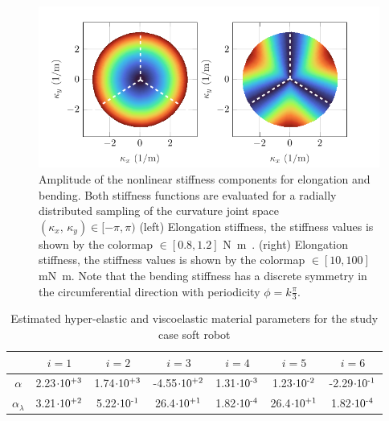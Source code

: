 \pgfplotsset{colormap name=turbo}
\begin{figure}[!t]
  \vspace{-5mm}
  \centering
  \includegraphics*{./pdf/thesis-figure-4-9.pdf}
  \vspace{-0.25cm}
  \caption{ Amplitude of the nonlinear stiffness components for elongation and bending. Both stiffness functions are evaluated for a radially distributed sampling of the curvature joint space $(\kappa_x,\,\kappa_y) \in [-\pi,\pi)$ (left) Elongation stiffness, the stiffness values is shown by the colormap \protect{}$\!\!\in [0.8,1.2]$ \si{\newton \meter \inv}. (right) Elongation stiffness, the stiffness values is shown by the colormap \protect{}$\!\!\in [10,100]$ \si{\milli \newton  \meter}. Note that the bending stiffness has a discrete symmetry in the circumferential direction with periodicity $\phi = k\tfrac{\pi}{3}$.}
  \vspace{-0.1cm}
  \label{fig:C2:stiffness_model}
\end{figure}

\begin{table}[!t]
  \caption{Estimated hyper-elastic and viscoelastic material parameters for the study case soft robot \label{tab:C2:elastic_parameters}}
  \centering
  \begin{tabular}{ccccccc}
  \hline
  & $i=1$ &  $i=2$ &  $i=3$ & $i=4$ &  $i=5$ & $i=6$ \\
  \hline
  \hline
  $\alpha$ &  \small{2.23}$\cdot10^{\textrm{+3}}$  & \small{1.74}$\cdot10^{\textrm{+3}}$  &  \small{-4.55}$\cdot10^{\textrm{+2}}$ & \small{1.31}$\cdot10^{\textrm{-3}}$  & \small{1.23}$\cdot10^{\textrm{-2}}$ & \small{-2.29}$\cdot10^{\textrm{-1}}$ \\[0.15em]
   $\alpha_\lambda$ &  \small{3.21}$\cdot10^{\textrm{+2}}$ & \small{5.22}$\cdot10^{\textrm{-1}}$ &  \small{26.4}$\cdot10^{\textrm{+1}}$& \small{1.82}$\cdot10^{\textrm{-4}}$ & \small{26.4}$\cdot10^{\textrm{+1}}$ & \small{1.82}$\cdot10^{\textrm{-4}}$ \\
  \hline
  \end{tabular}
  \vspace{-3mm}
  \end{table}

